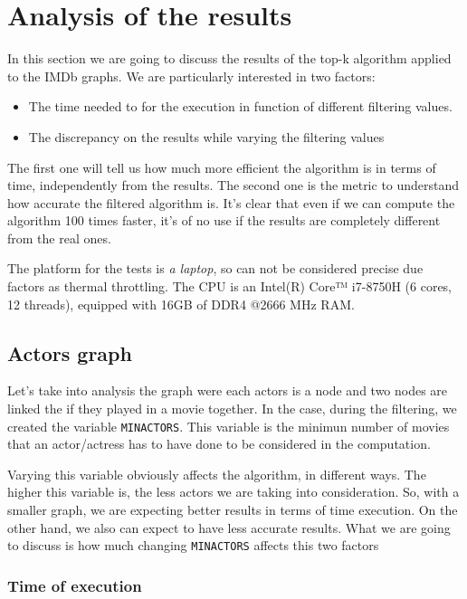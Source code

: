 \section{Analysis of the results}
In this section we are going to discuss the results of the top-k algorithm applied to the IMDb graphs. We are particularly interested in two factors:
\begin{itemize}
    \item The time needed to for the execution in function of different filtering values.
    \item The discrepancy on the results while varying the filtering values
\end{itemize}
The first one will tell us how much more efficient the algorithm is in terms of time, independently from the results. The second one is the metric to understand how accurate the filtered algorithm is. It's clear that even if we can compute the algorithm 100 times faster, it's of no use if the results are completely different from the real ones.\s

\nd The platform for the tests is \emph{a laptop}, so can not be considered precise due factors as thermal throttling. The CPU is an Intel(R) Core™ i7-8750H (6 cores, 12 threads), equipped with 16GB of DDR4 @2666 MHz RAM.

\subsection{Actors graph} \label{actors-graph}
Let's take into analysis the graph were each actors is a node and two nodes are linked the if they played in a movie together. In the case, during the filtering, we created the variable \texttt{MIN\textunderscore ACTORS}. This variable is the minimun number of movies that an actor/actress has to have done to be considered in the computation.

Varying this variable obviously affects the algorithm, in different ways. The higher this variable is, the less actors we are taking into consideration. So, with a smaller graph, we are expecting better results in terms of time execution. On the other hand, we also can expect to have less accurate results. What we are going to discuss is how much changing \texttt{MIN\textunderscore ACTORS} affects this two factors

\subsubsection{Time of execution} \label{time-actors}

